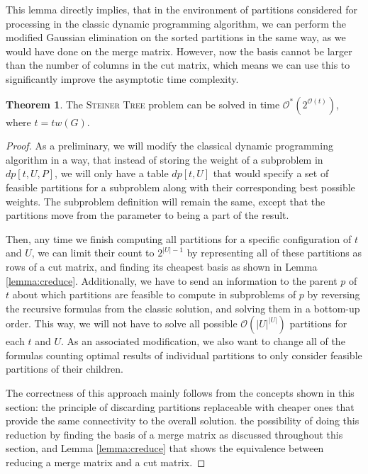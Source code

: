 \documentclass[thesis=M,english,hidelinks]{FITthesis}[2012/10/20]
\theoremstyle{definition}
\newtheorem{theorem}{Theorem}
\begin{document}
This lemma directly implies, that in the environment of partitions considered for processing in the classic dynamic
programming algorithm, we can perform the modified Gaussian elimination on the sorted partitions in the same way, as we
would have done on the merge matrix. However, now the basis cannot be larger than the number of columns in the cut
matrix, which means we can use this to significantly improve the asymptotic time complexity.

\begin{theorem}
    \label{theorem:cutmatrix}
    The \textsc{Steiner Tree} problem can be solved in time $\mathcal{O}^*(2^{\mathcal{O}(t)})$, where $t = tw(G)$.
\end{theorem}

\begin{proof}
    As a preliminary, we will modify the classical dynamic programming algorithm in a way, that instead of storing the
    weight of a subproblem in $dp[t, U, P]$, we will only have a table $dp[t, U]$ that would specify a set of feasible
    partitions for a subproblem along with their corresponding best possible weights. The subproblem definition will remain
    the same, except that the partitions move from the parameter to being a part of the result.

    Then, any time we finish computing all partitions for a specific configuration of $t$ and $U$, we can limit their
    count to $2^{|U|-1}$ by representing all of these partitions as rows of a cut matrix, and finding its cheapest basis
    as shown in Lemma \ref{lemma:creduce}. Additionally, we have to send an information to the parent $p$ of $t$ about
    which partitions are feasible to compute in subproblems of $p$ by reversing the recursive formulas from the classic
    solution, and solving them in a bottom-up order. This way, we will not have to solve all possible
    $\mathcal{O}(|U|^{|U|})$ partitions for each $t$ and $U$. As an associated modification, we also want to change all
    of the formulas counting optimal results of individual partitions to only consider feasible partitions of their
    children.

    The correctness of this approach mainly follows from the concepts shown in this section: the principle of
    discarding partitions replaceable with cheaper ones that provide the same connectivity to the overall solution. the
    possibility of doing this reduction by finding the basis of a merge matrix as discussed throughout this section, and
    Lemma \ref{lemma:creduce} that shows the equivalence between reducing a merge matrix and a cut matrix.


\end{proof}
\end{document}
